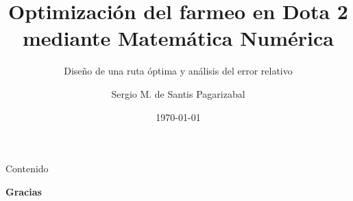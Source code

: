 \documentclass[10pt,aspectratio=169]{beamer}
\title[Farmeo óptimo en Dota 2]{Optimización del farmeo en Dota 2 mediante Matemática Numérica}
\subtitle{Diseño de una ruta óptima y análisis del error relativo}
\author{Sergio M. de Santis Pagarizabal}
\institute{Matemática Numérica}
\date{\today}
\begin{document}
\begin{frame}
  \titlepage
\end{frame}

\begin{frame}{Contenido}
  \tableofcontents
\end{frame}









\begin{frame}
  \centering
  \Huge \textbf{Gracias}
\end{frame}
\end{document}
